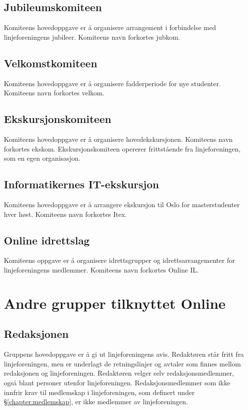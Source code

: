 \subsection{Jubileumskomiteen}{
Komiteens hovedoppgave er å organisere arrangement i forbindelse med linjeforeningens jubileer. Komiteens navn forkortes jubkom.

}

\subsection{Velkomstkomiteen}{
  Komiteens hovedoppgave er å organisere fadderperiode for nye studenter. Komiteens navn forkortes velkom.
}

\subsection{Ekskursjonskomiteen}{
Komiteens hovedoppgave er å organisere hovedekskursjonen. Komiteens navn forkortes ekskom. Ekskursjonskomiteen opererer frittstående fra linjeforeningen, som en egen organisasjon.
}

\subsection{Informatikernes IT-ekskursjon}{
Komiteens hovedoppgave er å arrangere ekskursjon til Oslo for masterstudenter hver høst. Komiteens navn forkortes Itex.
}

\subsection{Online idrettslag}
Komiteens oppgave er å organisere idrettsgrupper og idrettsarrangementer for linjeforeningens medlemmer. Komiteens navn forkortes Online IL.

\section{Andre grupper tilknyttet Online}
\vspace{18pt}

\subsection{Redaksjonen}{
Gruppens hovedoppgave er å gi ut linjeforeningens avis. Redaktøren står fritt fra linjeforeningen, men er underlagt de retningslinjer og avtaler som finnes mellom redaksjonen og linjeforeningen. Redaktøren velger selv redaksjonsmedlemmer, også blant personer utenfor linjeforeningen. Redaksjonsmedlemmer som ikke innfrir krav til medlemskap i linjeforeningen, som definert under §\ref{chapter:medlemskap}, er ikke medlemmer av linjeforeningen.
}

